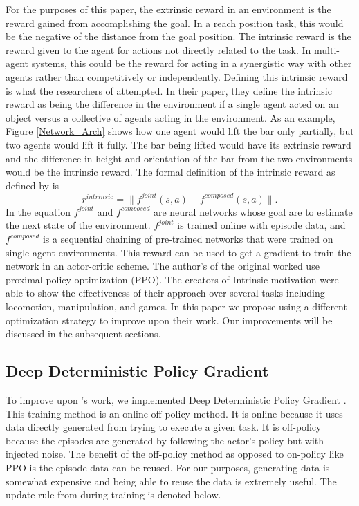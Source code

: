 \documentclass[conference]{IEEEtran}
\begin{document}
For the purposes of this paper, the extrinsic reward in an environment is the reward gained from accomplishing the goal. In a reach position task, this would be the negative of the distance from the goal position. The intrinsic reward is the reward given to the agent for actions not directly related to the task. In multi-agent systems, this could be the reward for acting in a synergistic way with other agents rather than competitively or independently. Defining this intrinsic reward is what the researchers of \cite{DBLB} attempted. In their paper, they define the intrinsic reward as being the difference in the environment if a single agent acted on an object versus a collective of agents acting in the environment. As an example, Figure \ref{Network_Arch} shows how one agent would lift the bar only partially, but two agents would lift it fully. The bar being lifted would have its extrinsic reward and the difference in height and orientation of the bar from the two environments would be the intrinsic reward. The formal definition of the intrinsic reward as defined by \cite{DBLB} is 
\begin{equation}
    r^{intrinsic}=\|f^{joint}(s,a)-f^{composed}(s,a)\|.
\end{equation}
In the equation $f^{joint}$ and $f^{composed}$ are neural networks whose goal are to estimate the next state of the environment. $f^{joint}$ is trained online with episode data, and $f^{composed}$ is a sequential chaining of pre-trained networks that were trained on single agent environments. This reward can be used to get a gradient to train the network in an actor-critic scheme. The author's of the original worked use proximal-policy optimization (PPO). The creators of Intrinsic motivation were able to show the effectiveness of their approach over several tasks including locomotion, manipulation, and games. In this paper we propose using a different optimization strategy to improve upon their work. Our improvements will be discussed in the subsequent sections.

\subsection{Deep Deterministic Policy Gradient}
To improve upon \cite{DBLB}'s work, we implemented Deep Deterministic Policy Gradient \cite{lillicrap2015continuous}. This training method is an online off-policy method. It is online because it uses data directly generated from trying to execute a given task. It is off-policy because the episodes are generated by following the actor's policy but with injected noise. The benefit of the off-policy method as opposed to on-policy like PPO is the episode data can be reused. For our purposes, generating data is somewhat expensive and being able to reuse the data is extremely useful. The update rule from \cite{lillicrap2015continuous} during training is denoted below.
\end{document}

